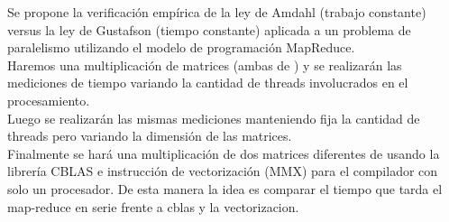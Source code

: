 Se propone la verificación empírica de la ley de Amdahl  (trabajo constante)
versus la ley de  Gustafson (tiempo constante) aplicada a un problema de
paralelismo utilizando el modelo de programación MapReduce.\\
Haremos una multiplicación de matrices (ambas de ) y se realizarán las
mediciones de tiempo variando la cantidad de threads involucrados en el
procesamiento.\\
Luego se realizarán las mismas mediciones manteniendo fija la cantidad de
threads pero variando la dimensión de las matrices.\\
Finalmente se hará una multiplicación de dos matrices diferentes de 
usando la librería CBLAS e instrucción de vectorización (MMX) para el compilador
con solo un procesador. De esta manera la idea es comparar el tiempo que tarda
el map-reduce en serie frente a cblas y la vectorizacion.
